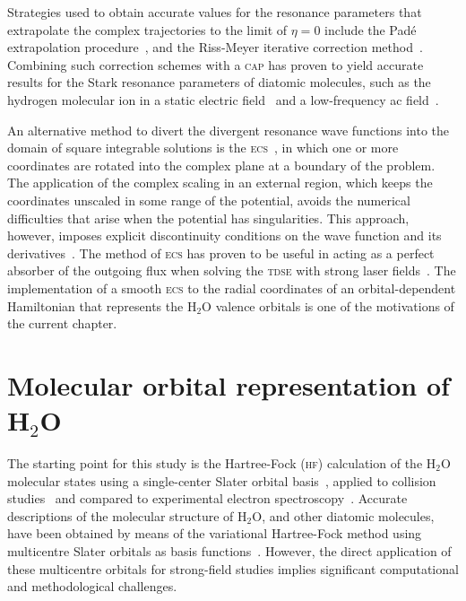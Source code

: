 Strategies used to obtain accurate values for the resonance parameters
that extrapolate the complex trajectories to the limit of $\eta = 0$
include the Pad\'{e} extrapolation
procedure~\cite{Moiseyev_Pade_2005}, and the Riss-Meyer iterative
correction method~\cite{RissMeyer_1993}. Combining such correction
schemes with a \textsc{cap} has proven to yield accurate results for
the Stark resonance parameters of diatomic molecules, such as the
hydrogen molecular ion in a static electric field~\cite{Tsog_2013} and
a low-frequency ac field~\cite{Tsog_H2mol_ac_2013}.

An alternative method to divert the divergent resonance wave functions
into the domain of square integrable solutions is the
\textsc{ecs}~\cite{Simon_1979}, in which one or more coordinates are
rotated into the complex plane at a boundary of the problem. The
application of the complex scaling in an external region, which keeps
the coordinates unscaled in some range of the potential, avoids the
numerical difficulties that arise when the potential has
singularities. This approach, however, imposes explicit discontinuity
conditions on the wave function and its
derivatives~\cite{ScrinziJChemPhys_ECS}. The method of \textsc{ecs}
has proven to be useful in acting as a perfect absorber of the
outgoing flux when solving the \textsc{tdse} with strong laser
fields~\cite{ecsScrinzi}. The implementation of a smooth \textsc{ecs}
to the radial coordinates of an orbital-dependent Hamiltonian that
represents the H$_{2}$O valence orbitals is one of the motivations of
the current chapter.



\section{Molecular orbital representation of H$_{2}$O}
\label{ch:h2o_structure}

The starting point for this study is the Hartree-Fock (\textsc{hf})
calculation of the H$_{2}$O molecular states using a single-center
Slater orbital
basis~\cite{Moccia_1964,Moccia_JCP_2164,Moccia_JCP_2176}, applied to
collision studies~\cite{Montanari_2013} and compared to experimental
electron spectroscopy~\cite{Hafied_2007}. Accurate descriptions of the
molecular structure of H$_{2}$O, and other diatomic molecules, have
been obtained by means of the variational Hartree-Fock method using
multicentre Slater orbitals as basis
functions~\cite{Pitzer_1968,Pitzer_1970}. However, the direct
application of these multicentre orbitals for strong-field studies
implies significant computational and methodological challenges.

